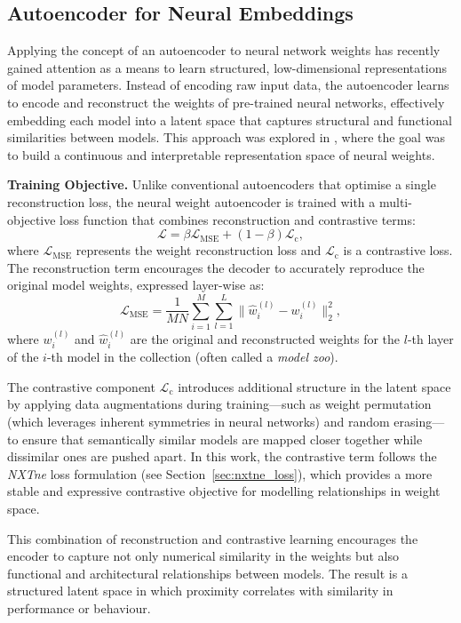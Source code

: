 \subsection{Autoencoder for Neural Embeddings}
Applying the concept of an autoencoder to neural network weights has recently gained attention as a means to learn structured, low-dimensional representations of model parameters. Instead of encoding raw input data, the autoencoder learns to encode and reconstruct the weights of pre-trained neural networks, effectively embedding each model into a latent space that captures structural and functional similarities between models. This approach was explored in \cite{NEURIPS2022_b2c4b7d3}, where the goal was to build a continuous and interpretable representation space of neural weights.

\vspace{0.5em}
\noindent
\textbf{Training Objective.}
Unlike conventional autoencoders that optimise a single reconstruction loss, the neural weight autoencoder is trained with a multi-objective loss function that combines reconstruction and contrastive terms:
\[
\mathcal{L} = \beta \mathcal{L}_{\text{MSE}} + (1 - \beta) \mathcal{L}_{\text{c}},
\]
where \( \mathcal{L}_{\text{MSE}} \) represents the weight reconstruction loss and \( \mathcal{L}_{\text{c}} \) is a contrastive loss.  
The reconstruction term encourages the decoder to accurately reproduce the original model weights, expressed layer-wise as:
\[
\mathcal{L}_{\text{MSE}} = \frac{1}{MN} \sum_{i=1}^{M} \sum_{l=1}^{L} \| \hat{w}_i^{(l)} - w_i^{(l)} \|_2^2,
\]
where \( w_i^{(l)} \) and \( \hat{w}_i^{(l)} \) are the original and reconstructed weights for the \( l \)-th layer of the \( i \)-th model in the collection (often called a \textit{model zoo}).  

The contrastive component \( \mathcal{L}_{\text{c}} \) introduces additional structure in the latent space by applying data augmentations during training—such as weight permutation (which leverages inherent symmetries in neural networks) and random erasing—to ensure that semantically similar models are mapped closer together while dissimilar ones are pushed apart. In this work, the contrastive term follows the \textit{NXTne} loss formulation (see Section~\ref{sec:nxtne_loss}), which provides a more stable and expressive contrastive objective for modelling relationships in weight space.


This combination of reconstruction and contrastive learning encourages the encoder to capture not only numerical similarity in the weights but also functional and architectural relationships between models. The result is a structured latent space in which proximity correlates with similarity in performance or behaviour.

